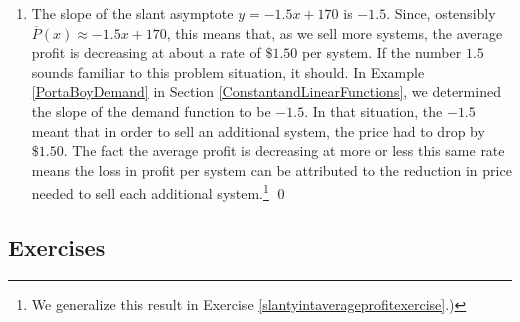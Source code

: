 \begin{ex}
\begin{enumerate}
\begin{figure}
\begin{center}
\caption{}
\label{fig:yeqpbarxetc}
\end{center}
\end{figure}

\item The slope of the slant asymptote $y = -1.5x+170$ is $-1.5$.  Since, ostensibly $\overline{P}(x) \approx -1.5 x + 170$, this means that, as we sell more systems, the average profit is decreasing at about a rate of $\$ 1.50$ per system.  If the number $1.5$ sounds familiar to this problem situation, it should.  In Example \ref{PortaBoyDemand} in Section \ref{ConstantandLinearFunctions}, we determined the slope of the demand function to be $-1.5$. In that situation, the $-1.5$ meant that in order to sell an additional system, the price had to drop by $\$ 1.50$.  The fact the average profit is decreasing at more or less this same rate means the loss in profit per system can be attributed to the reduction in price needed to sell each additional system.\footnote{We generalize this result in Exercise \ref{slantyintaverageprofitexercise}.)} \qed

\end{enumerate}

\end{ex}

\clearpage

\subsection{Exercises}



\closegraphsfile